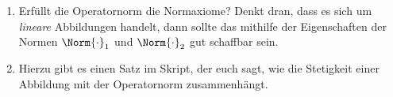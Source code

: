 {\begin{enumerate}
\begin{enumerate}
        \begin{equation}
            \Norm{F}_\tx{op}=\sup_{x\neq0}\frac{\Norm{F(x)}_2}{\Norm{\xvec}_1}
        \end{equation}
        (hier sollen einfach noch einmal die Zugehörigkeiten betont werden).
        \item Erfüllt die Operatornorm die Normaxiome? Denkt dran, dass es sich um \textit{lineare} Abbildungen handelt, dann sollte das mithilfe der Eigenschaften der Normen $\Norm{\cdot}_1$ und $\Norm{\cdot}_2$ gut schaffbar sein.
        \item Hierzu gibt es einen Satz im Skript, der euch sagt, wie die Stetigkeit einer Abbildung mit der Operatornorm zusammenhängt.
    \end{enumerate}
\end{enumerate}}
